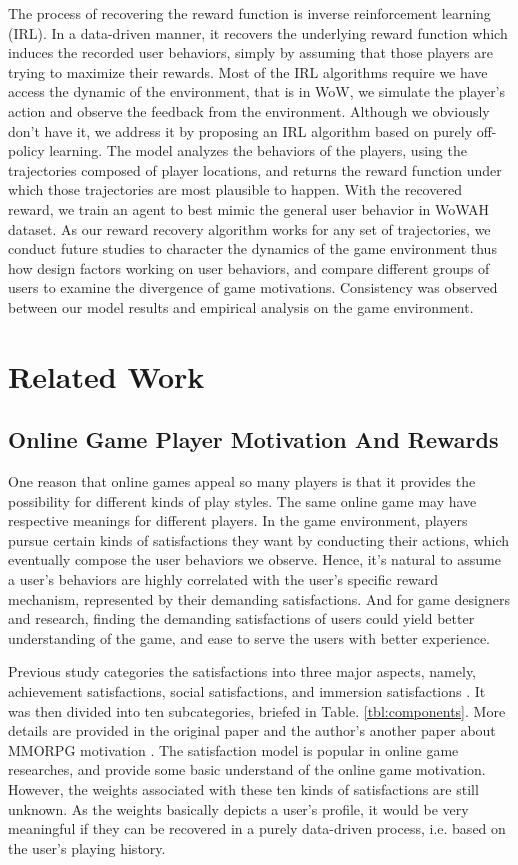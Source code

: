 \documentclass{sigchi}
\begin{document}
The process of recovering the reward function is inverse reinforcement learning (IRL). 
In a data-driven manner, it recovers the underlying reward function which induces the recorded user behaviors, simply by assuming that those players are trying to maximize their rewards. 
Most of the IRL algorithms require we have access the dynamic of the environment, that is in WoW, we simulate the player's action and observe the feedback from the environment. 
Although we obviously don't have it, we address it by proposing an IRL algorithm based on purely off-policy learning. 
The model analyzes the behaviors of the players, using the trajectories composed of player locations, and returns the reward function under which those trajectories are most plausible to happen. 
With the recovered reward, we train an agent to best mimic the general user behavior in WoWAH dataset. 
As our reward recovery algorithm works for any set of trajectories, we conduct future studies to character the dynamics of the game environment thus how design factors working on user behaviors, and compare different groups of users to examine the divergence of game motivations.
Consistency was observed between our model results and empirical analysis on the game environment. 


\section{Related Work}

\subsection{Online Game Player Motivation And Rewards}

One reason that online games appeal so many players is that it provides the possibility for different kinds of play styles. 
The same online game may have respective meanings for different players. 
In the game environment, players pursue certain kinds of satisfactions they want by conducting their actions, which eventually compose the user behaviors we observe. 
Hence, it's natural to assume a user's behaviors are highly correlated with the user's specific reward mechanism, represented by their demanding satisfactions. 
And for game designers and research, finding the demanding satisfactions of users could yield better understanding of the game, and ease to serve the users with better experience. 

Previous study categories the satisfactions into three major aspects, namely, achievement satisfactions, social satisfactions, and immersion satisfactions \cite{yee2006motivations}. 
It was then divided into ten subcategories, briefed in Table. \ref{tbl:components}. 
More details are provided in the original paper and the author's another paper about MMORPG motivation \cite{yee2006demographics}. 
The satisfaction model is popular in online game researches, and provide some basic understand of the online game motivation.
However, the weights associated with these ten kinds of satisfactions are still unknown. 
As the weights basically depicts a user's profile, it would be very meaningful if they can be recovered in a purely data-driven process, i.e. based on the user's playing history.
\end{document}
